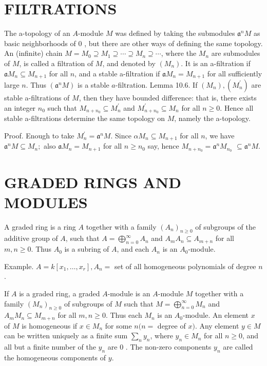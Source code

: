 \documentclass{standalone}
\theoremstyle{definition}
\theoremstyle{remark}
\begin{document}
\section{FILTRATIONS}
The a-topology of an $A$-module $M$ was defined by taking the submodules $\mathfrak{a}^{n} M$ as basic neighborhoods of 0 , but there are other ways of defining the same topology. An (infinite) chain $M=M_{0} \supseteq M_{1} \supseteq \cdots \supseteq M_{n} \supseteq \cdots$, where the $M_{n}$ are submodules of $M$, is called a filtration of $M$, and denoted by $\left(M_{n}\right)$. It is an a-filtration if $\mathfrak{a} M_{n} \subseteq M_{n+1}$ for all $n$, and a stable a-filtration if $\mathfrak{a} M_{n}=M_{n+1}$ for all sufficiently large $n$. Thus $\left(\mathfrak{a}^{n} M\right)$ is a stable $a$-filtration. Lemma 10.6. If $\left(M_{n}\right),\left(M_{n}^{\prime}\right)$ are stable a-filtrations of $M$, then they have bounded difference: that is, there exists an integer $n_{0}$ such that $M_{n+n_{0}} \subseteq M_{n}^{\prime}$ and $M_{n+n_{0}}^{\prime} \subseteq M_{n}$ for all $n \geqslant 0$. Hence all stable a-filtrations determine the same topology on $M$, namely the a-topology.

Proof. Enough to take $M_{n}^{\prime}=\mathfrak{a}^{n} M$. Since $\mathfrak{\alpha} M_{n} \subseteq M_{n+1}$ for all $n$, we have $\mathfrak{a}^{n} M \subseteq M_{n} ;$ also $\mathfrak{a} M_{n}=M_{n+1}$ for all $n \geqslant n_{0}$ say, hence $M_{n+n_{0}}=\mathfrak{a}^{n} M_{n_{0}}$ $\subseteq \mathfrak{a}^{n} M$.

\section{GRADED RINGS AND MODULES}
A graded ring is a ring $A$ together with a family $\left(A_{n}\right)_{n \geq 0}$ of subgroups of the additive group of $A$, such that $A=\bigoplus_{n=0}^{\infty} A_{n}$ and $A_{m} A_{n} \subseteq A_{m+n}$ for all $m, n \geqslant 0$. Thus $A_{0}$ is a subring of $A$, and each $A_{n}$ is an $A_{0}$-module.

Example. $A=k\left[x_{1}, \ldots, x_{r}\right], A_{n}=$ set of all homogeneous polynomials of degree $n$.

If $A$ is a graded ring, a graded $A$-module is an $A$-module $M$ together with a family $\left(M_{n}\right)_{n \geq 0}$ of subgroups of $M$ such that $M=\bigoplus_{n=0}^{\infty} M_{n}$ and $A_{m} M_{n} \subseteq M_{m+n}$ for all $m, n \geqslant 0$. Thus each $M_{n}$ is an $A_{0}$-module. An element $x$ of $M$ is homogeneous if $x \in M_{n}$ for some $n(n=$ degree of $x)$. Any element $y \in M$ can be written uniquely as a finite sum $\sum_{n} y_{n}$, where $y_{n} \in M_{n}$ for all $n \geqslant 0$, and all but a finite number of the $y_{n}$ are 0 . The non-zero components $y_{n}$ are called the homogeneous components of $y$.
\end{document}
